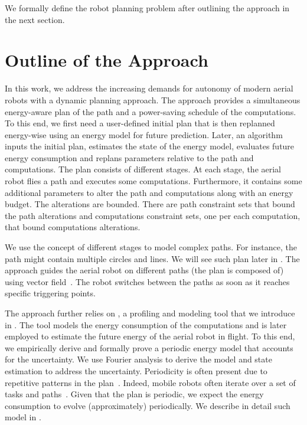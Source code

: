 We formally define the robot planning problem after outlining the approach in the next section.


\section{Outline of the Approach}
\label{sec:outline}

In this work, we address the increasing demands for autonomy of modern aerial robots with a dynamic planning approach. The approach provides a simultaneous energy-aware plan of the path and a power-saving schedule of the computations. To this end, we first need a user-defined initial plan that is then replanned energy-wise using an energy model for future prediction. Later, an algorithm inputs the initial plan, estimates the state of the energy model, evaluates future energy consumption and replans parameters relative to the path and computations. The plan consists of different stages. At each stage, the aerial robot flies a path and executes some computations. Furthermore, it contains some additional parameters to alter the path and computations along with an energy budget. The alterations are bounded. There are path constraint sets that bound the path alterations and computations constraint sets, one per each computation, that bound computations alterations.

We use the concept of different stages to model complex paths. For instance, the path might contain multiple circles and lines. We will see such plan later in . The approach guides the aerial robot on different paths (the plan is composed of) using vector field~\citep{de2017guidance}. The robot switches between the paths as soon as it reaches specific triggering points. 

The approach further relies on \powprof{}, a profiling and modeling tool that we introduce in . The tool models the energy consumption of the computations and is later employed to estimate the future energy of the aerial robot in flight. To this end, we empirically derive and formally prove a periodic energy model that accounts for the uncertainty. We use Fourier analysis to derive the model and state estimation to address the uncertainty. Periodicity is often present due to repetitive patterns in the plan~\citep{seewald2020mechanical}. Indeed, mobile robots often iterate over a set of tasks and paths~\citep{seewald2021energy}. Given that the plan is periodic, we expect the energy consumption to evolve (approximately) periodically. We describe in detail such model in . 

